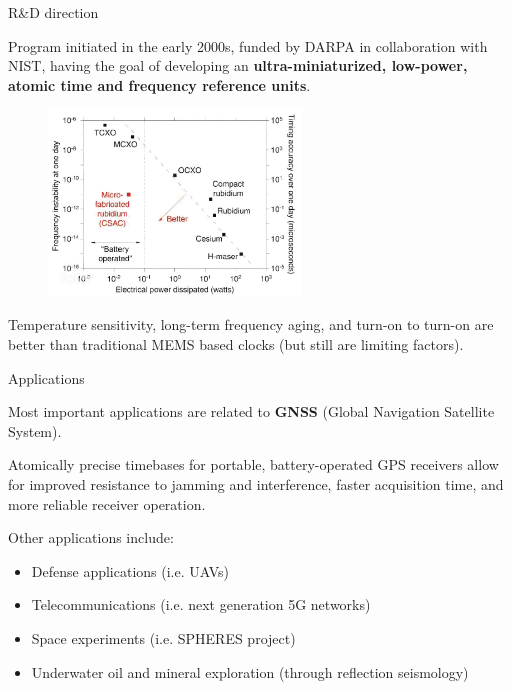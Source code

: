 \begin{frame}[fragile]{R\&D direction}

    Program initiated in the early 2000s, funded by DARPA in collaboration with NIST, having the goal of developing an \textbf{ultra-miniaturized, low-power, atomic time and frequency reference units}.

    \begin{figure}[H]
        \centering
        \includegraphics[width=0.6\textwidth]{img/clocks-comparison.png}
    \end{figure}

    Temperature sensitivity, long-term frequency aging, and turn-on to turn-on are better than traditional MEMS based clocks (but still are limiting factors).

\end{frame}



\begin{frame}{Applications}

    Most important applications are related to \textbf{GNSS} (Global Navigation Satellite System).

    Atomically precise timebases for portable, battery-operated GPS receivers allow for improved resistance to jamming and interference, faster acquisition time, and more reliable receiver operation.

    Other applications include:

    \begin{itemize}
        \item Defense applications (i.e. UAVs)
        \item Telecommunications (i.e. next generation 5G networks)
        \item Space experiments (i.e. SPHERES project)
        \item Underwater oil and mineral exploration (through reflection seismology)
    \end{itemize}

\end{frame}



